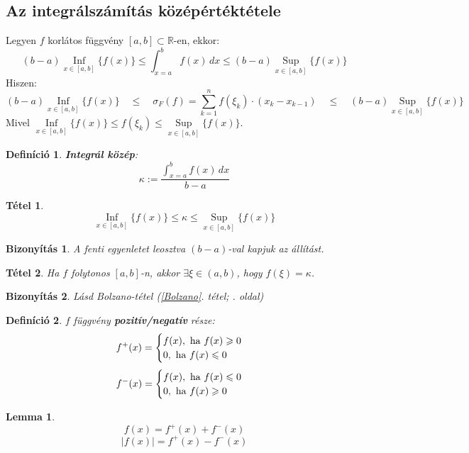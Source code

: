 \documentclass[a4paper,12pt,twoside]{book}
\DeclareMathOperator{\Inf}{Inf}
\DeclareMathOperator{\Sup}{Sup}
\newtheorem{tetel}{Tétel}[chapter]
\newtheorem{defi}{Definíció}[chapter]
\newtheorem{lemma}{Lemma}[chapter]
\theoremstyle{break}
\newtheorem{biz}{Bizonyítás}[chapter]
\theoremstyle{plain}
\newcommand{\hatInteg}[3]{\ensuremath{\int^{#2}_{x=#1} #3\, dx}}
\begin{document}
\subsection{Az integrálszámítás középértéktétele}

Legyen $f$ korlátos függvény $[a,b]\subset\mathbb{R}$-en, ekkor:
\[(b-a)\underset{x\in[a,b]}{\Inf}\{f(x)\} \leqslant \hatInteg{a}{b}{f(x)} \leqslant (b-a)\underset{x\in[a,b]}{\Sup}\{f(x)\}\]
Hiszen:
\[(b-a)\underset{x\in[a,b]}{\Inf}\{f(x)\} \quad \leqslant \quad \sigma_F(f)=\sum^{n}_{k=1}f(\xi_k)\cdot(x_k-x_{k-1}) \quad \leqslant\quad (b-a)\underset{x\in[a,b]}{\Sup}\{f(x)\}\]
Mivel $\underset{x\in[a,b]}{\Inf}\{f(x)\} \leqslant f(\xi_k) \leqslant \underset{x\in[a,b]}{\Sup}\{f(x)\}$.

\begin{defi}
 \textbf{Integrál közép}:
\[\kappa := \frac{\hatInteg{a}{b}{f(x)}}{b-a}\]
\end{defi}

\begin{tetel}
 \[\underset{x\in[a,b]}{\Inf}\{f(x)\} \leqslant \kappa \leqslant \underset{x\in[a,b]}{\Sup}\{f(x)\}\]
\end{tetel}
\begin{biz}
 A fenti egyenletet leosztva $(b-a)$-val kapjuk az állítást.
\end{biz}

\begin{tetel}
 Ha $f$ folytonos $[a,b]$-n, akkor $\exists \xi \in (a,b)$, hogy $f(\xi)=\kappa$.
\end{tetel}
\begin{biz}
 Lásd Bolzano-tétel (\ref{Bolzano}. tétel; \pageref{Bolzano}. oldal)
\end{biz}

\begin{defi}
 $f$ függvény \textbf{pozitív/negatív} része:
  \[f^+(x) = \begin{cases}f(x), \hbox{ ha } f(x)\geqslant 0\\ 0, \hbox{ ha } f(x)\leqslant 0\end{cases}\]
  \[f^-(x) = \begin{cases}f(x), \hbox{ ha } f(x)\leqslant 0\\ 0, \hbox{ ha } f(x)\geqslant 0\end{cases}\]
\end{defi}

\begin{lemma}
 \[f(x)=f^+(x)+f^-(x)\]
 \[|f(x)|=f^+(x)-f^-(x)\]
\end{lemma}
\end{document}
